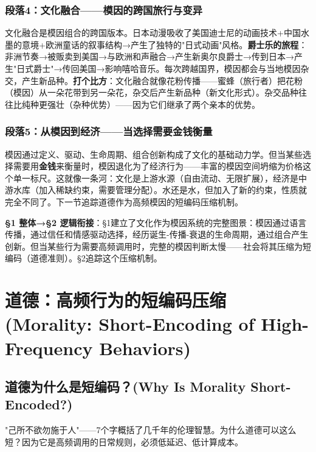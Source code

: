 \documentclass[../main.tex]{subfiles}
\begin{document}
\subsubsection*{段落4：文化融合——模因的跨国旅行与变异}

文化融合是模因组合的跨国版本。日本动漫吸收了美国迪士尼的动画技术+中国水墨的意境+欧洲童话的叙事结构→产生了独特的"日式动画"风格。\textbf{爵士乐的旅程}：非洲节奏→被贩卖到美国→与欧洲和声融合→产生新奥尔良爵士→传到日本→产生"日式爵士"→传回美国→影响嘻哈音乐。每次跨越国界，模因都会与当地模因杂交，产生新品种。\textbf{打个比方}：文化融合就像花粉传播——蜜蜂（旅行者）把花粉（模因）从一朵花带到另一朵花，杂交后产生新品种（新文化形式）。杂交品种往往比纯种更强壮（杂种优势）——因为它们继承了两个亲本的优势。

\subsubsection*{段落5：从模因到经济——当选择需要金钱衡量}

模因通过定义、驱动、生命周期、组合创新构成了文化的基础动力学。但当某些选择需要用\textbf{金钱}来衡量时，模因退化为了经济行为——丰富的模因空间坍缩为价格这个单一标尺。这就像一条河：文化是上游水源（自由流动、无限扩展），经济是中游水库（加入稀缺约束，需要管理分配）。水还是水，但加入了新的约束，性质就完全不同了。下一节追踪道德作为高频模因的短编码压缩机制。

	\textbf{§1 整体→§2 逻辑衔接}：§1建立了文化作为模因系统的完整图景：模因通过语言传播，通过信任和情感驱动选择，经历诞生-传播-衰退的生命周期，通过组合产生创新。但当某些行为需要高频调用时，完整的模因判断太慢——社会将其压缩为短编码（道德准则）。§2追踪这个压缩机制。

	\section{道德：高频行为的短编码压缩 (Morality: Short-Encoding of High-Frequency Behaviors)}

	\subsection{道德为什么是短编码？(Why Is Morality Short-Encoded?)}

	\begin{motivation}

		"己所不欲勿施于人"——7个字概括了几千年的伦理智慧。为什么道德可以这么短？因为它是高频调用的日常规则，必须低延迟、低计算成本。

	\end{motivation}
\end{document}
